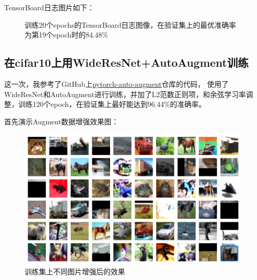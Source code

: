\documentclass[12pt, a4paper, oneside]{ctexart}
\numberwithin{equation}{section}  %
\begin{document}
TensorBoard日志图片如下：
\begin{figure}[H]
  \centering
  \setlength{\abovecaptionskip}{0ex}  %
  \caption{训练20个epochs的TensorBoard日志图像，在验证集上的最优准确率为第19个epoch时的84.48\%}
  \label{fig-1}
\end{figure}

\subsection{在cifar10上用WideResNet+AutoAugment训练}
这一次，我参考了GitHub上\href{https://github.com/4uiiurz1/pytorch-auto-augment/tree/master}{pytorch-auto-augment}仓库的代码，
使用了WideResNet和AutoAugment进行训练，并加了L2范数正则项，和余弦学习率调整，训练120个epoch，在验证集上最好能达到96.44\%的准确率。

首先演示Augment数据增强效果图：
\begin{figure}[htbp]
  \centering
  \includegraphics[width=\linewidth]{../code/figures/grid_augment.png}
  \caption{训练集上不同图片增强后的效果}
\end{figure}
\end{document}
